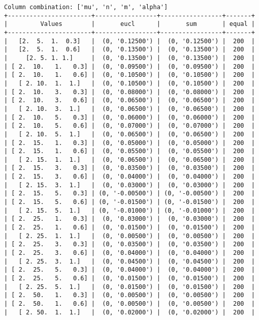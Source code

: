 \documentclass{article}
\begin{document}
\begin{verbatim}
Column combination: ['mu', 'n', 'm', 'alpha']
+-----------------------+-----------------+-----------------+-------+
|         Values        |       eucl      |       sum       | equal |
+-----------------------+-----------------+-----------------+-------+
|   [2.  5.  1.  0.3]   |  (0, '0.12500') |  (0, '0.12500') |  200  |
|   [2.  5.  1.  0.6]   |  (0, '0.13500') |  (0, '0.13500') |  200  |
|     [2. 5. 1. 1.]     |  (0, '0.13500') |  (0, '0.13500') |  200  |
| [ 2.  10.   1.   0.3] |  (0, '0.09500') |  (0, '0.09500') |  200  |
| [ 2.  10.   1.   0.6] |  (0, '0.10500') |  (0, '0.10500') |  200  |
|   [ 2. 10.  1.  1.]   |  (0, '0.10500') |  (0, '0.10500') |  200  |
| [ 2.  10.   3.   0.3] |  (0, '0.08000') |  (0, '0.08000') |  200  |
| [ 2.  10.   3.   0.6] |  (0, '0.06500') |  (0, '0.06500') |  200  |
|   [ 2. 10.  3.  1.]   |  (0, '0.06500') |  (0, '0.06500') |  200  |
| [ 2.  10.   5.   0.3] |  (0, '0.06000') |  (0, '0.06000') |  200  |
| [ 2.  10.   5.   0.6] |  (0, '0.07000') |  (0, '0.07000') |  200  |
|   [ 2. 10.  5.  1.]   |  (0, '0.06500') |  (0, '0.06500') |  200  |
| [ 2.  15.   1.   0.3] |  (0, '0.05000') |  (0, '0.05000') |  200  |
| [ 2.  15.   1.   0.6] |  (0, '0.05500') |  (0, '0.05500') |  200  |
|   [ 2. 15.  1.  1.]   |  (0, '0.06500') |  (0, '0.06500') |  200  |
| [ 2.  15.   3.   0.3] |  (0, '0.03500') |  (0, '0.03500') |  200  |
| [ 2.  15.   3.   0.6] |  (0, '0.04000') |  (0, '0.04000') |  200  |
|   [ 2. 15.  3.  1.]   |  (0, '0.03000') |  (0, '0.03000') |  200  |
| [ 2.  15.   5.   0.3] | (0, '-0.00500') | (0, '-0.00500') |  200  |
| [ 2.  15.   5.   0.6] | (0, '-0.01500') | (0, '-0.01500') |  200  |
|   [ 2. 15.  5.  1.]   | (0, '-0.01000') | (0, '-0.01000') |  200  |
| [ 2.  25.   1.   0.3] |  (0, '0.03000') |  (0, '0.03000') |  200  |
| [ 2.  25.   1.   0.6] |  (0, '0.01500') |  (0, '0.01500') |  200  |
|   [ 2. 25.  1.  1.]   |  (0, '0.00500') |  (0, '0.00500') |  200  |
| [ 2.  25.   3.   0.3] |  (0, '0.03500') |  (0, '0.03500') |  200  |
| [ 2.  25.   3.   0.6] |  (0, '0.04000') |  (0, '0.04000') |  200  |
|   [ 2. 25.  3.  1.]   |  (0, '0.04500') |  (0, '0.04500') |  200  |
| [ 2.  25.   5.   0.3] |  (0, '0.04000') |  (0, '0.04000') |  200  |
| [ 2.  25.   5.   0.6] |  (0, '0.01500') |  (0, '0.01500') |  200  |
|   [ 2. 25.  5.  1.]   |  (0, '0.01500') |  (0, '0.01500') |  200  |
| [ 2.  50.   1.   0.3] |  (0, '0.00500') |  (0, '0.00500') |  200  |
| [ 2.  50.   1.   0.6] |  (0, '0.00500') |  (0, '0.00500') |  200  |
|   [ 2. 50.  1.  1.]   |  (0, '0.02000') |  (0, '0.02000') |  200  |

\end{verbatim}
\end{document}

